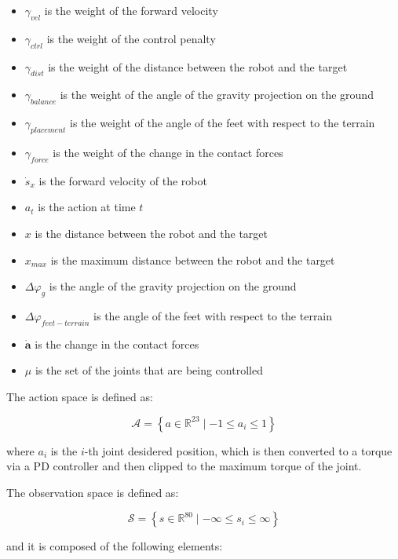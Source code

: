 \begin{itemize}
    \item $\gamma_{vel}$ is the weight of the forward velocity
    \item $\gamma_{ctrl}$ is the weight of the control penalty
    \item $\gamma_{dist}$ is the weight of the distance between the robot and the target
    \item $\gamma_{balance}$ is the weight of the angle of the gravity projection on the ground
    \item $\gamma_{placement}$ is the weight of the angle of the feet with respect to the terrain
    \item $\gamma_{force}$ is the weight of the change in the contact forces
    \item $\dot{s}_x$ is the forward velocity of the robot
    \item $a_t$ is the action at time $t$
    \item $x$ is the distance between the robot and the target
    \item $x_{max}$ is the maximum distance between the robot and the target
    \item $\Delta \varphi_g$ is the angle of the gravity projection on the ground
    \item $\Delta \varphi_{feet - terrain}$ is the angle of the feet with respect to the terrain
    \item $\mathbf{\dot{a}}$ is the change in the contact forces
    \item $\mu$ is the set of the joints that are being controlled
\end{itemize}

The action space is defined as:

\begin{equation}
    \mathcal{A} = \left\{ a \in \mathbb{R} ^{23} \mid -1 \leq a_i \leq 1 \right\}
\end{equation}

where $a_i$ is the $i$-th joint desidered position, which is then converted to a torque via a PD controller and then clipped to the maximum torque of the joint.

The observation space is defined as:

\begin{equation}
    \mathcal{S} = \left\{ s \in \mathbb{R} ^{80} \mid -\infty \leq s_i \leq \infty \right\}
\end{equation}

and it is composed of the following elements:

